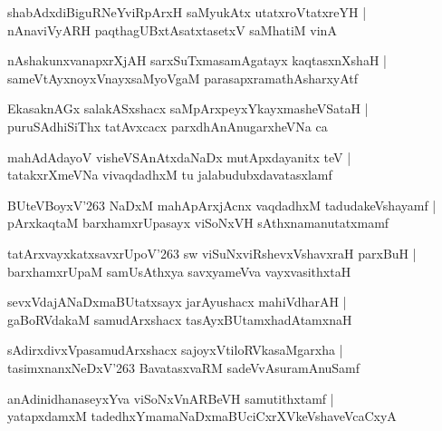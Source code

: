 \documentclass[twoside,12pt,openright]{book}
\newcounter{shloka}[chapter]
\begin{document}
\begin{shloka}
shabAdxdiBiguRNeYviRpArxH saMyukAtx utatxroVtatxreYH |\\
nAnaviVyARH paqthagUBxtAsatxtasetxV saMhatiM vinA
\end{shloka}

\begin{shloka}
nAshakunxvanapxrXjAH sarxSuTxmasamAgatayx kaqtasxnXshaH |\\
sameVtAyxnoyxVnayxsaMyoVgaM parasapxramathAsharxyAtf
\end{shloka}

\begin{shloka}
EkasaknAGx salakASxshacx saMpArxpeyxYkayxmasheVSataH |\\
puruSAdhiSiThx tatAvxcacx parxdhAnAnugarxheVNa ca
\end{shloka}

\begin{shloka}
mahAdAdayoV visheVSAnAtxdaNaDx mutApxdayanitx teV |\\
tatakxrXmeVNa vivaqdadhxM tu jalabudubxdavatasxlamf
\end{shloka}

\begin{shloka}
BUteVBoyxV\char'263 NaDxM mahApArxjAcnx vaqdadhxM tadudakeVshayamf |\\
pArxkaqtaM barxhamxrUpasayx viSoNxVH sAthxnamanutatxmamf
\end{shloka}

\begin{shloka}
tatArxvayxkatxsavxrUpoV\char'263 sw viSuNxviRshevxVshavxraH parxBuH |\\
barxhamxrUpaM samUsAthxya savxyameVva vayxvasithxtaH
\end{shloka}

\begin{shloka}
sevxVdajANaDxmaBUtatxsayx jarAyushacx mahiVdharAH |\\
gaBoRVdakaM samudArxshacx tasAyxBUtamxhadAtamxnaH
\end{shloka}

\begin{shloka}
sAdirxdivxVpasamudArxshacx sajoyxVtiloRVkasaMgarxha |\\
tasimxnanxNeDxV\char'263 BavatasxvaRM sadeVvAsuramAnuSamf
\end{shloka}

\begin{shloka}
anAdinidhanaseyxYva viSoNxVnARBeVH samutithxtamf |\\
yatapxdamxM tadedhxYmamaNaDxmaBUciCxrXVkeVshaveVcaCxyA
\end{shloka}
\end{document}
